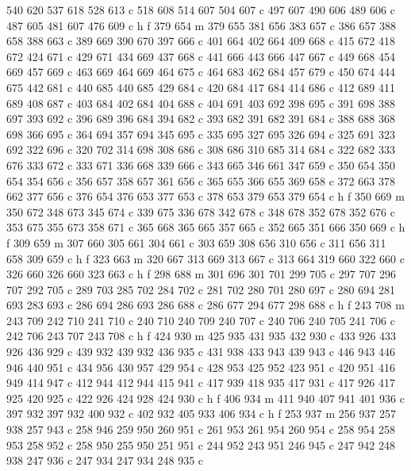 {{   540 620 537 618 528 613 c
   518 608 514 607 504 607 c
   497 607 490 606 489 606 c
   487 605 481 607 476 609 c
   h f
   379 654 m
   379 655 381 656 383 657 c
   386 657 388 658 388 663 c
   389 669 390 670 397 666 c
   401 664 402 664 409 668 c
   415 672 418 672 424 671 c
   429 671 434 669 437 668 c
   441 666 443 666 447 667 c
   449 668 454 669 457 669 c
   463 669 464 669 464 675 c
   464 683 462 684 457 679 c
   450 674 444 675 442 681 c
   440 685 440 685 429 684 c
   420 684 417 684 414 686 c
   412 689 411 689 408 687 c
   403 684 402 684 404 688 c
   404 691 403 692 398 695 c
   391 698 388 697 393 692 c
   396 689 396 684 394 682 c
   393 682 391 682 391 684 c
   388 688 368 698 366 695 c
   364 694 357 694 345 695 c
   335 695 327 695 326 694 c
   325 691 323 692 322 696 c
   320 702 314 698 308 686 c
   308 686 310 685 314 684 c
   322 682 333 676 333 672 c
   333 671 336 668 339 666 c
   343 665 346 661 347 659 c
   350 654 350 654 354 656 c
   356 657 358 657 361 656 c
   365 655 366 655 369 658 c
   372 663 378 662 377 656 c
   376 654 376 653 377 653 c
   378 653 379 653 379 654 c
   h f
   350 669 m
   350 672 348 673 345 674 c
   339 675 336 678 342 678 c
   348 678 352 678 352 676 c
   353 675 355 673 358 671 c
   365 668 365 665 357 665 c
   352 665 351 666 350 669 c
   h f
   309 659 m
   307 660 305 661 304 661 c
   303 659 308 656 310 656 c
   311 656 311 658 309 659 c
   h f
   323 663 m
   320 667 313 669 313 667 c
   313 664 319 660 322 660 c
   326 660 326 660 323 663 c
   h f
   298 688 m
   301 696 301 701 299 705 c
   297 707 296 707 292 705 c
   289 703 285 702 284 702 c
   281 702 280 701 280 697 c
   280 694 281 693 283 693 c
   286 694 286 693 286 688 c
   286 677 294 677 298 688 c
   h f
   243 708 m
   243 709 242 710 241 710 c
   240 710 240 709 240 707 c
   240 706 240 705 241 706 c
   242 706 243 707 243 708 c
   h f
   424 930 m
   425 935 431 935 432 930 c
   433 926 433 926 436 929 c
   439 932 439 932 436 935 c
   431 938 433 943 439 943 c
   446 943 446 946 440 951 c
   434 956 430 957 429 954 c
   428 953 425 952 423 951 c
   420 951 416 949 414 947 c
   412 944 412 944 415 941 c
   417 939 418 935 417 931 c
   417 926 417 925 420 925 c
   422 926 424 928 424 930 c
   h f
   406 934 m
   411 940 407 941 401 936 c
   397 932 397 932 400 932 c
   402 932 405 933 406 934 c
   h f
   253 937 m
   256 937 257 938 257 943 c
   258 946 259 950 260 951 c
   261 953 261 954 260 954 c
   258 954 258 953 258 952 c
   258 950 255 950 251 951 c
   244 952 243 951 246 945 c
   247 942 248 938 247 936 c
   247 934 247 934 248 935 c
}}
